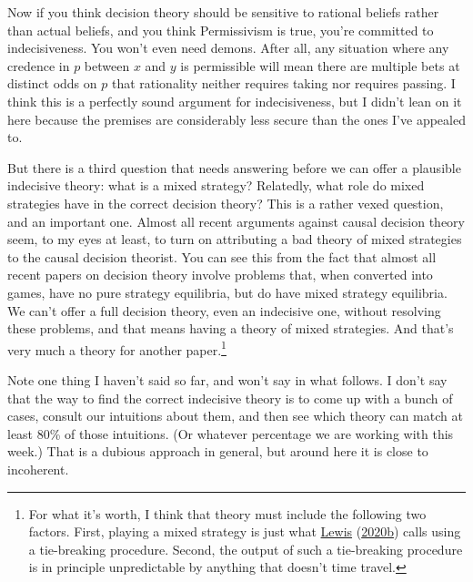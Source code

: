 \documentclass[
  12pt,
]{article}
\begin{document}
Now if you think decision theory should be sensitive to rational beliefs
rather than actual beliefs, and you think Permissivism is true, you're
committed to indecisiveness. You won't even need demons. After all, any
situation where any credence in \(p\) between \(x\) and \(y\) is
permissible will mean there are multiple bets at distinct odds on \(p\)
that rationality neither requires taking nor requires passing. I think
this is a perfectly sound argument for indecisiveness, but I didn't lean
on it here because the premises are considerably less secure than the
ones I've appealed to.

But there is a third question that needs answering before we can offer a
plausible indecisive theory: what is a mixed strategy? Relatedly, what
role do mixed strategies have in the correct decision theory? This is a
rather vexed question, and an important one. Almost all recent arguments
against causal decision theory seem, to my eyes at least, to turn on
attributing a bad theory of mixed strategies to the causal decision
theorist. You can see this from the fact that almost all recent papers
on decision theory involve problems that, when converted into games,
have no pure strategy equilibria, but do have mixed strategy equilibria.
We can't offer a full decision theory, even an indecisive one, without
resolving these problems, and that means having a theory of mixed
strategies. And that's very much a theory for another paper.\footnote{For
  what it's worth, I think that theory must include the following two
  factors. First, playing a mixed strategy is just what
  \protect\hyperlink{ref-Lewis-Kavka-10071979}{Lewis}
  (\protect\hyperlink{ref-Lewis-Kavka-10071979}{2020b}) calls using a
  tie-breaking procedure. Second, the output of such a tie-breaking
  procedure is in principle unpredictable by anything that doesn't time
  travel.}

Note one thing I haven't said so far, and won't say in what follows. I
don't say that the way to find the correct indecisive theory is to come
up with a bunch of cases, consult our intuitions about them, and then
see which theory can match at least 80\% of those intuitions. (Or
whatever percentage we are working with this week.) That is a dubious
approach in general, but around here it is close to incoherent.
\end{document}
